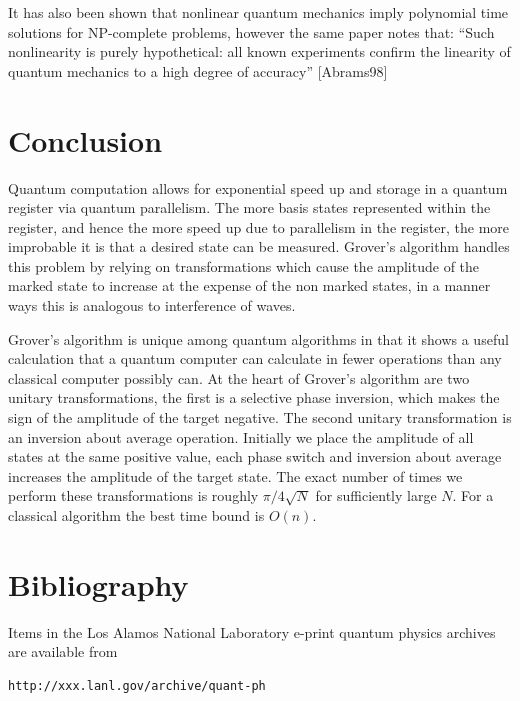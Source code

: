 \documentclass[]{article}
\begin{document}
It has also been shown that nonlinear quantum mechanics imply
polynomial time solutions for NP-complete problems, however the same
paper notes that: ``Such nonlinearity is purely hypothetical: all
known experiments confirm the linearity of quantum mechanics to a high
degree of accuracy'' [Abrams98]

\section{Conclusion}

Quantum computation allows for exponential speed up and storage in a
quantum register via quantum parallelism.  The more basis states
represented within the register, and hence the more speed up due to
parallelism in the register, the more improbable it is that a desired
state can be measured.  Grover's algorithm handles this problem by
relying on transformations which cause the amplitude of the marked
state to increase at the expense of the non marked states, in a manner
ways this is analogous to interference of waves.

Grover's algorithm is unique among quantum algorithms in that it shows
a useful calculation that a quantum computer can calculate in fewer
operations than any classical computer possibly can. At the heart of
Grover's algorithm are two unitary transformations, the first is a
selective phase inversion, which makes the sign of the amplitude of
the target negative.  The second unitary transformation is an
inversion about average operation.  Initially we place the amplitude
of all states at the same positive value, each phase switch and
inversion about average increases the amplitude of the target state.
The exact number of times we perform these transformations is roughly
$\pi/4\sqrt{N}$ for sufficiently large $N$.  For a classical algorithm
the best time bound is $O(n)$.

\section{Bibliography}

	Items in the Los Alamos National Laboratory e-print quantum
	physics archives are available from
	\begin{verbatim}http://xxx.lanl.gov/archive/quant-ph\end{verbatim}
\end{document}
